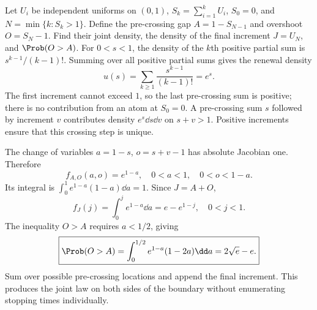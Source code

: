 Let $U_i$ be independent uniforms on $(0,1)$, $S_k=\sum_{i=1}^kU_i$, $S_0=0$, and $N=\min\{k:S_k>1\}$. Define the pre-crossing gap $A=1-S_{N-1}$ and overshoot $O=S_N-1$. Find their joint density, the density of the final increment $J=U_N$, and $\Prob(O>A)$.
\solution For $0<s<1$, the density of the $k$th positive partial sum is $s^{k-1}/(k-1)!$. Summing over all positive partial sums gives the renewal density
\[
u(s)=\sum_{k\ge1}\frac{s^{k-1}}{(k-1)!}=e^s.
\]
The first increment cannot exceed $1$, so the last pre-crossing sum is positive; there is no contribution from an atom at $S_0=0$. A pre-crossing sum $s$ followed by increment $v$ contributes density $e^s\dd s\dd v$ on $s+v>1$. Positive increments ensure that this crossing step is unique.

The change of variables $a=1-s$, $o=s+v-1$ has absolute Jacobian one. Therefore
\[
\boxed{f_{A,O}(a,o)=e^{1-a},\quad 0<a<1,\quad0<o<1-a.}
\]
Its integral is $\int_0^1e^{1-a}(1-a)\dd a=1$. Since $J=A+O$,
\[
\boxed{f_J(j)=\int_0^je^{1-a}\dd a=e-e^{1-j},\quad0<j<1.}
\]
The inequality $O>A$ requires $a<1/2$, giving
\[
\boxed{\Prob(O>A)=\int_0^{1/2}e^{1-a}(1-2a)\dd a
=2\sqrt e-e.}
\]
\insight Sum over possible pre-crossing locations and append the final increment. This produces the joint law on both sides of the boundary without enumerating stopping times individually.
